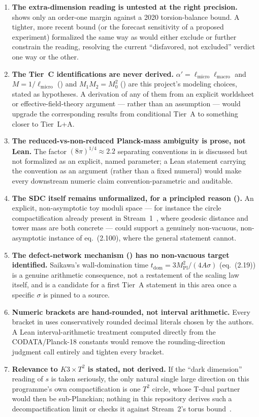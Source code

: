 \documentclass[11pt,a4paper]{article}
\theoremstyle{remark}
\begin{document}
\begin{enumerate}
\item \textbf{The extra-dimension reading is untested at the right precision.}
 shows only an order-one margin against a 2020 torsion-balance bound. A
tighter, more recent bound (or the forecast sensitivity of a proposed experiment) formalized the
same way as  would either exclude or further constrain the reading, resolving the
current ``disfavored, not excluded'' verdict one way or the other.
\item \textbf{The Tier~C identifications are never derived.} $\alpha'=\ell_{\mathrm{micro}}\ell_{\mathrm{macro}}$
and $M=1/\ell_{\mathrm{micro}}$ () and $M_1M_2=M_0^2$ () are
this project's modeling choices, stated as hypotheses. A derivation of any of them from an
explicit worldsheet or effective-field-theory argument --- rather than an assumption --- would
upgrade the corresponding results from conditional Tier~A to something closer to Tier~L+A.
\item \textbf{The reduced-vs-non-reduced Planck-mass ambiguity is prose, not Lean.} The factor
$(8\pi)^{1/4}\approx2.2$ separating conventions in  is discussed but not
formalized as an explicit, named parameter; a Lean statement carrying the convention as an
argument (rather than a fixed numeral) would make every downstream numeric claim
convention-parametric and auditable.
\item \textbf{The SDC itself remains unformalized, for a principled reason ().}
An explicit, non-asymptotic toy moduli space --- for instance the circle compactification already
present in Stream~1~\cite{Callens2026Paper7}, where geodesic distance and tower mass are both
concrete --- could support a genuinely non-vacuous, non-asymptotic instance of eq.~(2.100),
where the general statement cannot.
\item \textbf{The defect-network mechanism () has no non-vacuous target
identified.} Saikawa's wall-domination time $t_{\mathrm{dom}}=3M_{\mathrm{Pl}}^2/(4A\sigma)$
(eq.~(2.19)) is a genuine arithmetic consequence, not a restatement of the scaling law itself, and
is a candidate for a first Tier~A statement in this area once a specific $\sigma$ is pinned to a
source.
\item \textbf{Numeric brackets are hand-rounded, not interval arithmetic.} Every bracket in
 uses conservatively rounded decimal literals chosen by the
authors. A Lean interval-arithmetic treatment computed directly from the CODATA/Planck-18 constants
would remove the rounding-direction judgment call entirely and tighten every bracket.
\item \textbf{Relevance to $K3\times T^2$ is stated, not derived.} If the ``dark dimension'' reading
of $s$ is taken seriously, the only natural single large direction on this programme's own
compactification is one $T^2$ circle, whose T-dual partner would then be sub-Planckian; nothing in
this repository derives such a decompactification limit or checks it against Stream~2's torus
bound~\cite{Callens2026Paper8}.
\end{enumerate}
\end{document}
